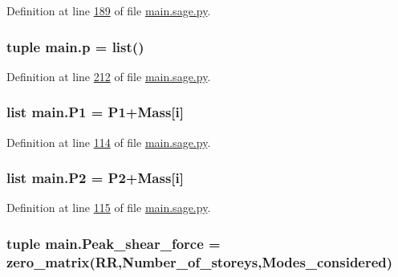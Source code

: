 Definition at line \hyperlink{main_8sage_8py_source_l00189}{189} of file \hyperlink{main_8sage_8py_source}{main.\+sage.\+py}.

\hypertarget{namespacemain_ab31fc16b432d2248a6c76c6a18d741d0}{}
\subsubsection[{p}]{\setlength{\rightskip}{0pt plus 5cm}tuple main.\+p = list()}\label{namespacemain_ab31fc16b432d2248a6c76c6a18d741d0}


Definition at line \hyperlink{main_8sage_8py_source_l00212}{212} of file \hyperlink{main_8sage_8py_source}{main.\+sage.\+py}.

\hypertarget{namespacemain_add7e0394c94a2e2115aff785eb6995e3}{}
\subsubsection[{P1}]{\setlength{\rightskip}{0pt plus 5cm}list main.\+P1 = P1+Mass\mbox{[}{\bf i}\mbox{]}}\label{namespacemain_add7e0394c94a2e2115aff785eb6995e3}


Definition at line \hyperlink{main_8sage_8py_source_l00114}{114} of file \hyperlink{main_8sage_8py_source}{main.\+sage.\+py}.

\hypertarget{namespacemain_a1b83b7a3849a8e1c84b9906c45625fec}{}
\subsubsection[{P2}]{\setlength{\rightskip}{0pt plus 5cm}list main.\+P2 = P2+Mass\mbox{[}{\bf i}\mbox{]}}\label{namespacemain_a1b83b7a3849a8e1c84b9906c45625fec}


Definition at line \hyperlink{main_8sage_8py_source_l00115}{115} of file \hyperlink{main_8sage_8py_source}{main.\+sage.\+py}.

\hypertarget{namespacemain_a9e135aea550f8ea419857f817a196d56}{}
\subsubsection[{Peak\+\_\+shear\+\_\+force}]{\setlength{\rightskip}{0pt plus 5cm}tuple main.\+Peak\+\_\+shear\+\_\+force = zero\+\_\+matrix(R\+R,Number\+\_\+of\+\_\+storeys,{\bf Modes\+\_\+considered})}\label{namespacemain_a9e135aea550f8ea419857f817a196d56}


